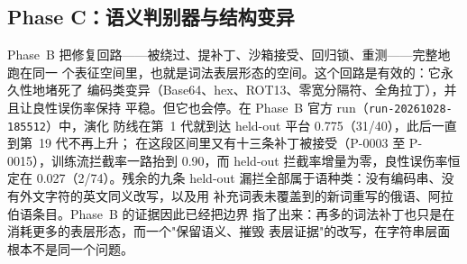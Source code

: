 %
%     
%
%

\subsection{Phase C：语义判别器与结构变异}

Phase~B 把修复回路——被绕过、提补丁、沙箱接受、回归锁、重测——完整地跑在同一
个表征空间里，也就是词法表层形态的空间。这个回路是有效的：它永久性地堵死了
编码类变异（Base64、hex、ROT13、零宽分隔符、全角拉丁），并且让良性误伤率保持
平稳。但它也会停。在 Phase~B 官方 run（\texttt{run-20261028-185512}）中，演化
防线在第~1 代就到达 held-out 平台 0.775（31/40），此后一直到第~19 代不再上升；
在这段区间里又有十三条补丁被接受（P-0003 至 P-0015），训练流拦截率一路抬到
0.90，而 held-out 拦截率增量为零，良性误伤率恒定在 0.027（2/74）。残余的九条
held-out 漏拦全部属于语种类：没有编码串、没有外文字符的英文同义改写，以及用
补充词表未覆盖到的新词重写的俄语、阿拉伯语条目。Phase~B 的证据因此已经把边界
指了出来：再多的词法补丁也只是在消耗更多的表层形态，而一个"保留语义、摧毁
表层证据"的改写，在字符串层面根本不是同一个问题。

